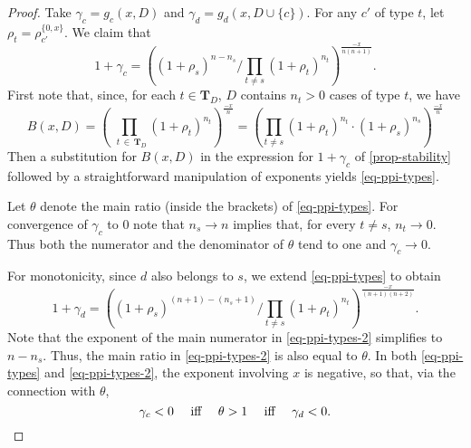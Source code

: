 \documentclass[ecta,nameyear,draft]{econsocart}
\makeatletter
\newcommand{\countof}{\mathbin{\#}\hskip1pt}
\newcommand{\mbbt}{{\mathbf {T}}}
\newcommand\Wlog{W\@.l\@.o\@.g\@ifnextchar.{}{.\@}}
\theoremstyle{plain}
\theoremstyle{remark}
\makeatother
\begin{document}
\begin{proof}
  Take $\gamma_c = g_c(x, D)$ and $\gamma_d = g_d(x, D\cup\{c\})$.  For any
  $c'$ of type $t$, let $\rho_t = \rho_{c'}^{\{0, x\}}$.  We claim that
  \begin{equation}\label{eq-ppi-types}
    1 + \gamma_c = \left(\left(1 + \rho_s\right)^{n - n_s} / \prod_{t \neq s}
    \left(1 + \rho_t\right)^{n_t} \right)^\frac{-x}{n(n+1)}.
  \end{equation}
  First note that, since, for each $t \in \mbbt_D$, $D$ contains $n_t > 0$
  cases of type $t$, we have 
  \begin{equation*}
    B(x, D) = \left(\prod_{\,\,\, t \,\in\, \mbbt_D} \left(1 +
    \rho_t\right)^{n_t}\right)^\frac{-x}{n} = \left(\prod_{t \neq s} \left(1 +
    \rho_t\right)^{n_t} \cdot \left(1 + \rho_s\right)^{n_s}\right)^\frac{-x}{n} 
  \end{equation*}
  Then a substitution for $B(x, D)$ in the expression for $1 + \gamma_c$ of
  \cref{prop-stability} followed by a straightforward manipulation of exponents
  yields \cref{eq-ppi-types}.

  Let $\theta$ denote the main ratio (inside the brackets) of
  \cref{eq-ppi-types}.  For convergence of $\gamma_c$ to $0$ note that $n_s
  \rightarrow n$ implies that, for every $t \neq s$, $n_t \rightarrow 0$. Thus
  both the numerator and the denominator of $\theta$ tend to one and
  $\gamma_c \rightarrow 0$.

  For monotonicity, since $d$ also belongs to $s$, we extend
  \cref{eq-ppi-types} to obtain
  \begin{equation}\label{eq-ppi-types-2}
    1 + \gamma_d = \left(\left(1 + \rho_s\right)^{(n + 1) - (n_s + 1)} /
    \prod_{t \neq s} \left(1 + \rho_t\right)^{n_t}
    \right)^\frac{-x}{(n+1)(n+2)}.
  \end{equation}
  Note that the exponent of the main numerator in \cref{eq-ppi-types-2}
  simplifies to $n - n_s$. Thus, the main ratio in \cref{eq-ppi-types-2} is
  also equal to $\theta$.  In both \cref{eq-ppi-types} and
  \cref{eq-ppi-types-2}, the exponent involving $x$ is negative, so that, via
  the connection with $\theta$, 
  \begin{equation}\label{eq-theta-equiv}
    \text{$\gamma_c < 0$ \quad iff \quad $\theta > 1$ \quad iff \quad
    $\gamma_d < 0$.}
  \end{equation}
 

\end{proof}
\end{document}

